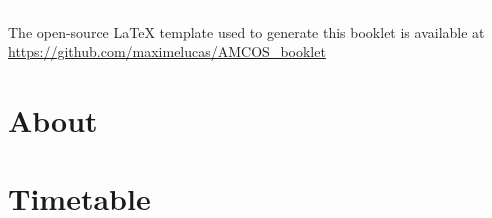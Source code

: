 \documentclass[openany, parskip=full, 12pt, a4]{scrbook}
\begin{document}
	
	
\mbox{}
\thispagestyle{empty}
\vfill
\begin{center}
	\ifOnline
\textcolor{white}{slubi}
	\else
\textcolor{white}{slubi}
	\fi %
	\\[20pt] %
	The open-source \LaTeX{} template used to generate this booklet is available at \url{https://github.com/maximelucas/AMCOS\_booklet}
\end{center}

\newpage

\tableofcontents

\chapter{About}



\chapter{Timetable}







%


\end{document}
